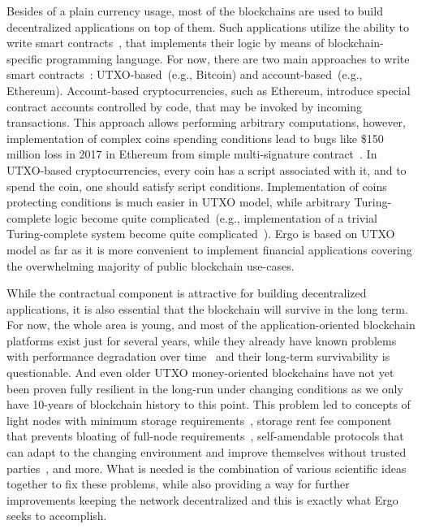Besides of a plain currency usage, most of the blockchains are used to build decentralized applications on top of them.
Such applications utilize the ability to write smart contracts~\cite{szabo1994smart}, that implements their logic
by means of blockchain-specific programming language.
For now, there are two main approaches to write smart contracts~\cite{zahnentferner2018chimeric}:
UTXO-based~(e.g., Bitcoin) and account-based~(e.g., Ethereum).
Account-based cryptocurrencies, such as Ethereum, introduce special contract accounts controlled by code,
that may be invoked by incoming transactions.
This approach allows performing arbitrary computations, however, implementation of complex coins spending conditions
lead to bugs like \$150 million loss in 2017 in
Ethereum from simple multi-signature contract~\cite{parityLock}.
In UTXO-based cryptocurrencies, every coin has a script associated with it, and to spend the coin, one should
satisfy script conditions.
Implementation of coins protecting conditions is much easier in UTXO model,
while arbitrary Turing-complete logic become quite complicated~(e.g., implementation of a trivial Turing-complete
system become quite complicated~\cite{chepurnoy2018self}).
Ergo is based on UTXO model as far as it is more convenient to implement financial applications covering the
overwhelming majority of public blockchain use-cases.

While the contractual component is attractive for building decentralized applications,
it is also essential that the blockchain will survive in the long term.
For now, the whole area is young, and most of the application-oriented blockchain platforms exist just for several years,
while they already have known problems with performance degradation over time~\cite{???} and their long-term survivability is questionable.
And even older UTXO money-oriented blockchains have not yet been proven fully resilient in the long-run
under changing conditions as we only have 10-years of blockchain history to this point.
This problem led to concepts of light nodes with minimum storage requirements~\cite{reyzin2017improving},
storage rent fee component that prevents bloating of full-node requirements~\cite{chepurnoy2018systematic},
self-amendable protocols that can adapt to the changing environment and improve themselves without
trusted parties~\cite{goodman2014tezos}, and more.
What is needed is the combination of various scientific ideas together to fix these problems, while also
providing a way for further improvements keeping the network decentralized and this is exactly what Ergo seeks to accomplish.


